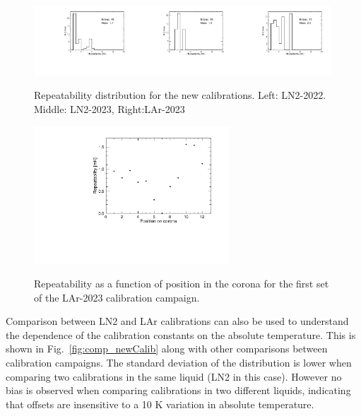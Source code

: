 \begin{figure}[htbp]
    \centering
    {\includegraphics[width=0.33\textwidth]{images/figure_19_a.pdf}}{\includegraphics[width=0.33\textwidth]{images/figure_19_b.pdf}}{\includegraphics[width=0.33\textwidth]{images/figure_19_c.pdf}}
    \caption{Repeatability distribution for the new calibrations. Left: LN2-2022. Middle: LN2-2023, Right:LAr-2023}
    \label{fig:newCalib_stat}
    \end{figure}

\begin{figure}[htbp]
\centering
{\includegraphics[width=0.65\textwidth]{images/figure_20.pdf}}
\caption{Repeatability as a function of position in the corona for the first set of the LAr-2023 calibration campaign.}
\label{fig:newCalib_statVsChannel}
\end{figure}

Comparison between LN2 and LAr calibrations can also be used to understand the dependence of the calibration constants on the absolute temperature. This is shown in Fig.~\ref{fig:comp_newCalib} along with other comparisons between calibration campaigns. The standard deviation of the distribution is lower when comparing two calibrations in the same liquid (LN2 in this case). However no bias is observed when comparing calibrations in two different liquids, indicating that offsets are insensitive to a 10 K variation in absolute temperature.

